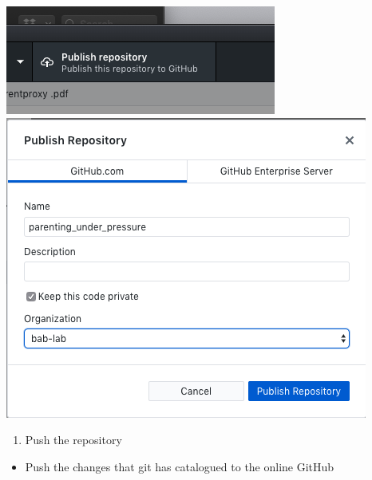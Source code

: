 \documentclass[]{book}
\providecommand{\tightlist}{%
  \setlength{\itemsep}{0pt}\setlength{\parskip}{0pt}}
\begin{document}
\includegraphics{images/research_protocols/github/7.png}
\includegraphics{images/research_protocols/github/8.png}

\begin{enumerate}
\def\labelenumi{\arabic{enumi}.}
\setcounter{enumi}{7}
\tightlist
\item
  Push the repository
\end{enumerate}

\begin{itemize}
\tightlist
\item
  Push the changes that git has catalogued to the online GitHub
\end{itemize}
\end{document}

